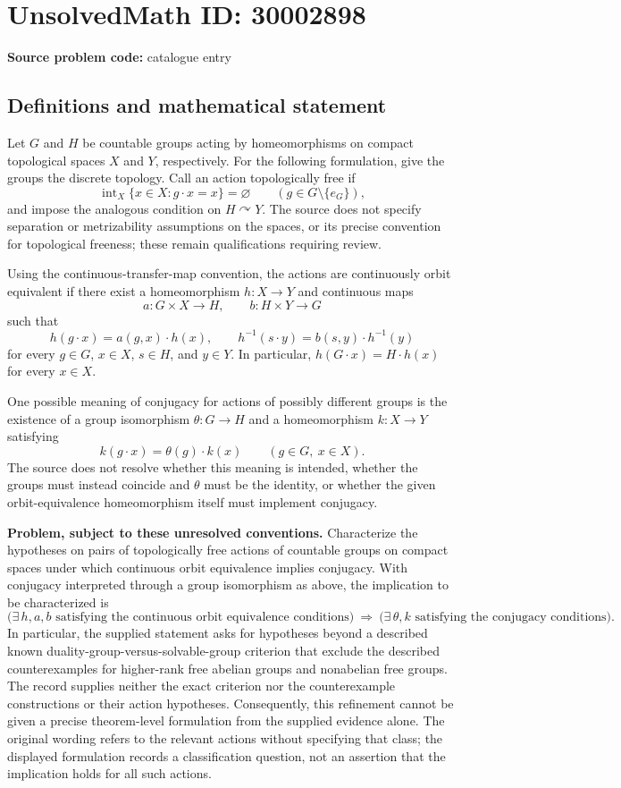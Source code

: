 \documentclass[11pt]{article}
\begin{document}
\section*{UnsolvedMath ID: 30002898}
\textbf{Source problem code:} catalogue entry
\subsection{Definitions and mathematical statement}
Let \(G\) and \(H\) be countable groups acting by homeomorphisms on compact topological spaces \(X\) and \(Y\), respectively. For the following formulation, give the groups the discrete topology. Call an action topologically free if
\[
\operatorname{int}_X\{x\in X:g\cdot x=x\}=\varnothing
\qquad(g\in G\setminus\{e_G\}),
\]
and impose the analogous condition on \(H\curvearrowright Y\). The source does not specify separation or metrizability assumptions on the spaces, or its precise convention for topological freeness; these remain qualifications requiring review.

Using the continuous-transfer-map convention, the actions are continuously orbit equivalent if there exist a homeomorphism \(h:X\to Y\) and continuous maps
\[
a:G\times X\to H,
\qquad b:H\times Y\to G
\]
such that
\[
h(g\cdot x)=a(g,x)\cdot h(x),
\qquad
h^{-1}(s\cdot y)=b(s,y)\cdot h^{-1}(y)
\]
for every \(g\in G\), \(x\in X\), \(s\in H\), and \(y\in Y\). In particular, \(h(G\cdot x)=H\cdot h(x)\) for every \(x\in X\).

One possible meaning of conjugacy for actions of possibly different groups is the existence of a group isomorphism \(\theta:G\to H\) and a homeomorphism \(k:X\to Y\) satisfying
\[
k(g\cdot x)=\theta(g)\cdot k(x)
\qquad(g\in G,\ x\in X).
\]
The source does not resolve whether this meaning is intended, whether the groups must instead coincide and \(\theta\) must be the identity, or whether the given orbit-equivalence homeomorphism itself must implement conjugacy.

\textbf{Problem, subject to these unresolved conventions.} Characterize the hypotheses on pairs of topologically free actions of countable groups on compact spaces under which continuous orbit equivalence implies conjugacy. With conjugacy interpreted through a group isomorphism as above, the implication to be characterized is
\[
\bigl(\exists\,h,a,b\text{ satisfying the continuous orbit equivalence conditions}\bigr)
\ \Longrightarrow\
\bigl(\exists\,\theta,k\text{ satisfying the conjugacy conditions}\bigr).
\]
In particular, the supplied statement asks for hypotheses beyond a described known duality-group-versus-solvable-group criterion that exclude the described counterexamples for higher-rank free abelian groups and nonabelian free groups. The record supplies neither the exact criterion nor the counterexample constructions or their action hypotheses. Consequently, this refinement cannot be given a precise theorem-level formulation from the supplied evidence alone. The original wording refers to the relevant actions without specifying that class; the displayed formulation records a classification question, not an assertion that the implication holds for all such actions.
\end{document}
